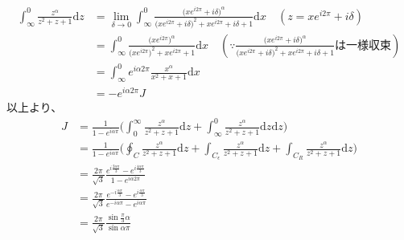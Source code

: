 \documentclass[dvipdfmx,a4paper]{jsarticle}
\begin{document}
 \begin{align*}
 \int_{\infty}^{0} \frac{z^{\alpha}}{z^2 + z + 1} \mathrm{d}z &= \lim_{\delta \to 0}\int_{\infty}^{0} \frac{\bigl(xe^{i2\pi} + i\delta\bigr)^{\alpha}}{\bigl(xe^{i2\pi} + i\delta\bigr)^2 + xe^{i2\pi} + i\delta +  1} \mathrm{d}x \quad(z = xe^{i2\pi} + i\delta)\\
 &= \int_{\infty}^{0} \frac{\bigl(xe^{i2\pi}\bigr)^{\alpha}}{\bigl(xe^{i2\pi} \bigr)^2 + xe^{i2\pi} +  1}  \mathrm{d}x\quad(\because\frac{\bigl(xe^{i2\pi} + i\delta\bigr)^{\alpha}}{\bigl(xe^{i2\pi} + i\delta\bigr)^2 + xe^{i2\pi} + i\delta +  1} は一様収束)\\
 &= \int_{\infty}^{0} e^{i\alpha 2\pi}\frac{x^{\alpha}}{x^2 + x + 1} \mathrm{d}x\\
 &= -e^{i\alpha 2\pi} J
 \end{align*}
 以上より、
 \begin{align*}
 J &= \frac{1}{1 - e^{i\alpha \pi}}\biggl(\int_{0}^{\infty} \frac{z^{\alpha}}{z^2 + z + 1} \mathrm{d}z + \int_{\infty}^{0} \frac{z^{\alpha}}{z^2 + z + 1} \mathrm{d}z \mathrm{d}z \biggr)\\
 &=\frac{1}{1 - e^{i\alpha \pi}}\biggl(\oint_C\frac{z^{\alpha}}{z^2 + z + 1}\mathrm{d}z + \int_{C_\epsilon}\frac{z^{\alpha}}{z^2 + z + 1}\mathrm{d}z +  \int_{C_R}\frac{z^{\alpha}}{z^2 + z + 1}\mathrm{d}z\biggr)\\
 &= \frac{2 \pi}{\sqrt{3}}\frac{e^{i\frac{2\alpha\pi}{3}} - e^{i\frac{4\alpha\pi}{3}}}{1 - e^{i\alpha 2\pi}}\\
&= \frac{2 \pi}{\sqrt{3}}\frac{e^{-i\frac{\alpha\pi}{3}} - e^{i\frac{\alpha\pi}{3}}}{e^{-i\alpha \pi} - e^{i\alpha \pi}}\\
&= \frac{2 \pi}{\sqrt{3}}\frac{\sin{\frac{\pi}{3}\alpha}}{\sin{\alpha\pi}}
 \end{align*}
 \\
 
\end{document}
